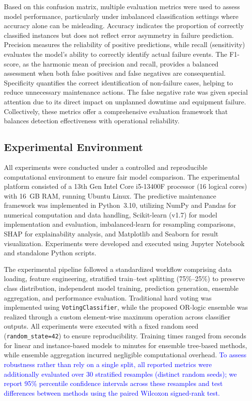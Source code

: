 \documentclass[final,5p, twocolumn]{elsarticle}
\begin{document}
Based on this confusion matrix, multiple evaluation metrics were used to assess model performance, particularly under imbalanced classification settings where accuracy alone can be misleading. Accuracy indicates the proportion of correctly classified instances but does not reflect error asymmetry in failure prediction. Precision measures the reliability of positive predictions, while recall (sensitivity) evaluates the model’s ability to correctly identify actual failure events. The F1-score, as the harmonic mean of precision and recall, provides a balanced assessment when both false positives and false negatives are consequential. Specificity quantifies the correct identification of non-failure cases, helping to reduce unnecessary maintenance actions. The false negative rate was given special attention due to its direct impact on unplanned downtime and equipment failure. Collectively, these metrics offer a comprehensive evaluation framework that balances detection effectiveness with operational reliability.

\subsection{Experimental Environment}
\label{sec:experimental_environment}
All experiments were conducted under a controlled and reproducible computational environment to ensure fair model comparison. The experimental platform consisted of a 13th Gen Intel Core i5-13400F processor (16 logical cores) with 16~GB RAM, running Ubuntu Linux. The predictive maintenance framework was implemented in Python~3.10, utilizing NumPy and Pandas for numerical computation and data handling, Scikit-learn (v1.7) for model implementation and evaluation, imbalanced-learn for resampling comparisons, SHAP for explainability analysis, and Matplotlib and Seaborn for result visualization. Experiments were developed and executed using Jupyter Notebook and standalone Python scripts.

The experimental pipeline followed a standardized workflow comprising data loading, feature engineering, stratified train–test splitting (75\%–25\%) to preserve class distribution, independent model training, prediction generation, ensemble aggregation, and performance evaluation. Traditional hard voting was implemented using \texttt{VotingClassifier}, while the proposed OR-logic ensemble was realized through a custom element-wise maximum operation across classifier outputs. All experiments were executed with a fixed random seed (\texttt{random\_state=42}) to ensure reproducibility. Training times ranged from seconds for linear and instance-based models to minutes for ensemble tree-based methods, while ensemble aggregation incurred negligible computational overhead. \textcolor{blue}{To assess robustness rather than rely on a single split, all reported metrics were additionally evaluated over 30 stratified resamples (distinct random seeds); we report 95\% percentile confidence intervals across these resamples and test differences between methods using the paired Wilcoxon signed-rank test.}
\end{document}
